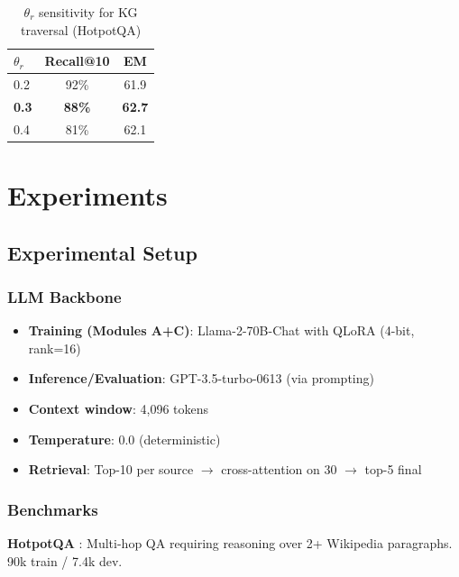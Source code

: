 \documentclass[10pt,twocolumn]{article}
\begin{document}
\begin{table}[h]
\centering
\caption{$\theta_r$ sensitivity for KG traversal (HotpotQA)}
\label{tab:theta}
\small
\begin{tabular}{@{}lcc@{}}
\toprule
$\theta_r$ & \textbf{Recall@10} & \textbf{EM} \\
\midrule
0.2 & 92\% & 61.9 \\
\textbf{0.3} & \textbf{88\%} & \textbf{62.7} \\
0.4 & 81\% & 62.1 \\
\bottomrule
\end{tabular}
\end{table}


\section{Experiments}
\label{sec:experiments}

\subsection{Experimental Setup}

\subsubsection{LLM Backbone}
\begin{itemize}
    \item \textbf{Training (Modules A+C)}: Llama-2-70B-Chat with QLoRA (4-bit, rank=16)
    \item \textbf{Inference/Evaluation}: GPT-3.5-turbo-0613 (via prompting)
    \item \textbf{Context window}: 4,096 tokens
    \item \textbf{Temperature}: 0.0 (deterministic)
    \item \textbf{Retrieval}: Top-10 per source $\rightarrow$ cross-attention on 30 $\rightarrow$ top-5 final
\end{itemize}

\subsubsection{Benchmarks}
\label{sec:benchmarks}

\textbf{HotpotQA} \cite{yang2018hotpotqa}: Multi-hop QA requiring reasoning over 2+ Wikipedia paragraphs. 90k train / 7.4k dev.
\end{document}
